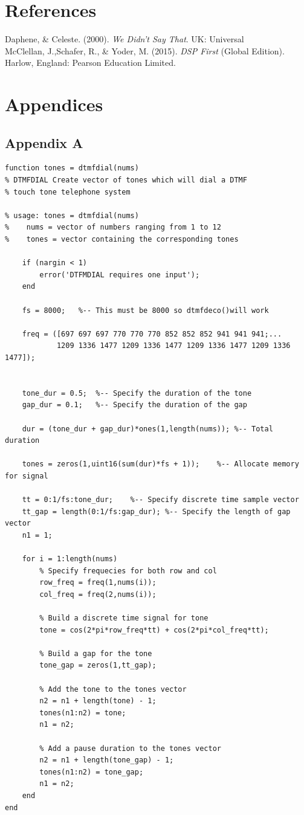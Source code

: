 \documentclass{article}
\begin{document}
\section{References}

Daphene, \& Celeste. (2000). \textit{We Didn't Say That}. UK: Universal\\

McClellan, J.,Schafer, R., \& Yoder, M. (2015). \textit{DSP First} (Global Edition). Harlow, England: Pearson Education Limited.

\newpage

\section{Appendices}

\subsection{Appendix A}

\begin{lstlisting}
function tones = dtmfdial(nums)
% DTMFDIAL Create vector of tones which will dial a DTMF
% touch tone telephone system

% usage: tones = dtmfdial(nums)
%    nums = vector of numbers ranging from 1 to 12
%    tones = vector containing the corresponding tones

	if (nargin < 1)
		error('DTFMDIAL requires one input');
	end

	fs = 8000;   %-- This must be 8000 so dtmfdeco()will work

	freq = ([697 697 697 770 770 770 852 852 852 941 941 941;...
			1209 1336 1477 1209 1336 1477 1209 1336 1477 1209 1336 1477]);


	tone_dur = 0.5;  %-- Specify the duration of the tone
	gap_dur = 0.1;   %-- Specify the duration of the gap

	dur = (tone_dur + gap_dur)*ones(1,length(nums)); %-- Total duration

	tones = zeros(1,uint16(sum(dur)*fs + 1));    %-- Allocate memory for signal

	tt = 0:1/fs:tone_dur;    %-- Specify discrete time sample vector 
	tt_gap = length(0:1/fs:gap_dur); %-- Specify the length of gap vector
	n1 = 1;

	for i = 1:length(nums)
		% Specify frequecies for both row and col
		row_freq = freq(1,nums(i));
		col_freq = freq(2,nums(i));

		% Build a discrete time signal for tone
		tone = cos(2*pi*row_freq*tt) + cos(2*pi*col_freq*tt);

		% Build a gap for the tone
		tone_gap = zeros(1,tt_gap);

		% Add the tone to the tones vector
		n2 = n1 + length(tone) - 1;
		tones(n1:n2) = tone;
		n1 = n2;

		% Add a pause duration to the tones vector
		n2 = n1 + length(tone_gap) - 1;
		tones(n1:n2) = tone_gap;
		n1 = n2;
	end
end
\end{lstlisting}
\end{document}

